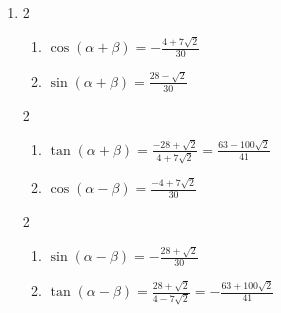 \documentclass{ximera}
\begin{document}
\begin{enumerate}
\begin{multicols}{2}
\begin{enumerate}
\item  $\sin(\alpha - \beta) = \frac{\sqrt{2}}{2}$
\item  $\tan(\alpha - \beta) = -1$ 

\end{enumerate}

\end{multicols}

\item \begin{multicols}{2}

\begin{enumerate}

\item  $\cos(\alpha + \beta) = - \frac{4+7\sqrt{2}}{30}$
\item  $\sin(\alpha + \beta) = \frac{28-\sqrt{2}}{30}$

\setcounter{HWindent}{\value{enumii}}

\end{enumerate}

\end{multicols}

\begin{multicols}{2}

\begin{enumerate}

\setcounter{enumii}{\value{HWindent}}

\item  $\tan(\alpha + \beta) = \frac{-28+\sqrt{2}}{4+7\sqrt{2}} = \frac{63-100\sqrt{2}}{41}$
\item  $\cos(\alpha - \beta) =  \frac{-4+7\sqrt{2}}{30}$

\setcounter{HWindent}{\value{enumii}}

\end{enumerate}

\end{multicols}

\begin{multicols}{2}

\begin{enumerate}

\setcounter{enumii}{\value{HWindent}}

\item  $\sin(\alpha - \beta) = - \frac{28+\sqrt{2}}{30}$
\item  $\tan(\alpha - \beta)= \frac{28+\sqrt{2}}{4-7\sqrt{2}} = -\frac{63+100\sqrt{2}}{41}$

\end{enumerate}


\end{multicols}
\end{enumerate}
\end{document}
